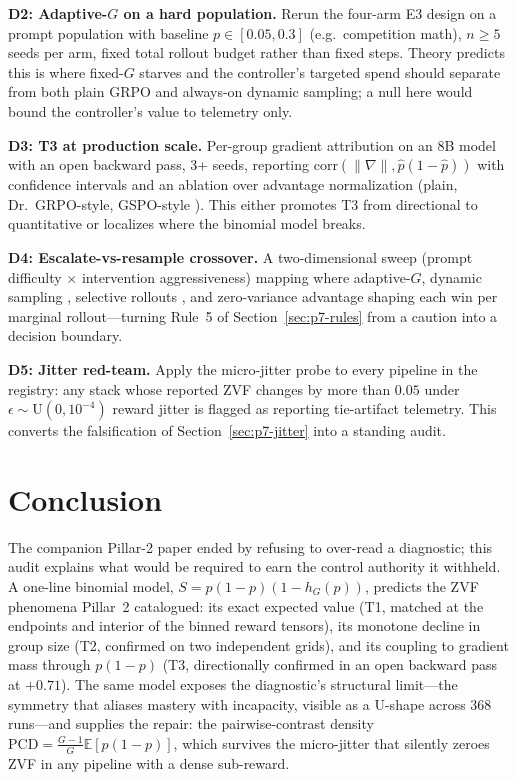 \documentclass{article}
\providecommand{\eps}{\ensuremath{\epsilon}}
\newcommand{\E}{\mathbb{E}}
\begin{document}
\textbf{D2: Adaptive-$G$ on a hard population.} Rerun the four-arm E3
design on a prompt population with baseline $p \in [0.05, 0.3]$ (e.g.\
competition math), $n \geq 5$ seeds per arm, fixed total rollout budget
rather than fixed steps. Theory predicts this is where fixed-$G$ starves
and the controller's targeted spend should separate from both plain GRPO
and always-on dynamic sampling; a null here would bound the controller's
value to telemetry only.

\textbf{D3: T3 at production scale.} Per-group gradient attribution on an
8B model with an open backward pass, 3+ seeds, reporting
$\mathrm{corr}(\|\nabla\|, \hat p(1-\hat p))$ with confidence intervals and
an ablation over advantage normalization (plain, Dr.~GRPO-style, GSPO-style
\citep{qwen2025gspo}). This either promotes T3 from directional to
quantitative or localizes where the binomial model breaks.

\textbf{D4: Escalate-vs-resample crossover.} A two-dimensional sweep
(prompt difficulty $\times$ intervention aggressiveness) mapping where
adaptive-$G$, dynamic sampling \citep{yu2025dapo}, selective rollouts
\citep{zhang2026greso}, and zero-variance advantage shaping
\citep{le2025rlzvp} each win per marginal rollout---turning
Rule~5 of Section~\ref{sec:p7-rules} from a caution into a decision
boundary.

\textbf{D5: Jitter red-team.} Apply the micro-jitter probe to every
pipeline in the registry: any stack whose reported ZVF changes by more than
$0.05$ under $\eps \sim \mathrm{U}(0, 10^{-4})$ reward jitter is flagged as
reporting tie-artifact telemetry. This converts the falsification of
Section~\ref{sec:p7-jitter} into a standing audit.
 \section{Conclusion}
\label{sec:p7-conclusion}
The companion Pillar-2 paper ended by refusing to over-read a diagnostic;
this audit explains what would be required to earn the control authority it
withheld. A one-line binomial model,
$S = p(1-p)(1 - h_G(p))$, predicts the ZVF phenomena Pillar~2 catalogued:
its exact expected value (T1, matched at the endpoints and interior of the
binned reward tensors), its monotone decline in group size (T2, confirmed
on two independent grids), and its coupling to gradient mass through
$p(1-p)$ (T3, directionally confirmed in an open backward pass at
$+0.71$). The same model exposes the diagnostic's structural limit---the
symmetry that aliases mastery with incapacity, visible as a U-shape across
368 runs---and supplies the repair: the pairwise-contrast density
$\mathrm{PCD} = \frac{G-1}{G}\E[p(1-p)]$, which survives the micro-jitter
that silently zeroes ZVF in any pipeline with a dense sub-reward.
\end{document}
